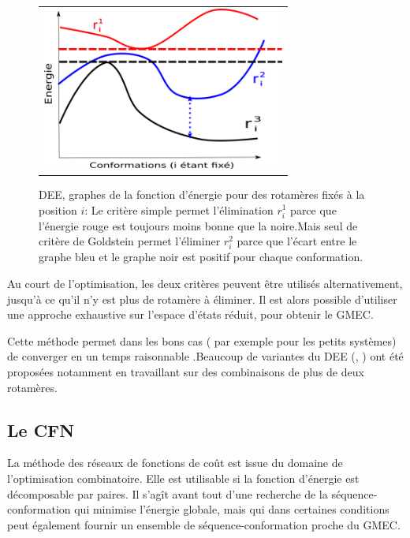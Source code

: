    \begin{figure}[!htbp]
     \centering
     \begin{tabular}{c}
       \includegraphics[width=8cm]{figure/DEE.png} &
     \end{tabular}
     
     \caption{DEE, graphes de la fonction d'énergie pour des rotamères fixés à la position $i$: Le critère simple permet l'élimination $r^1_i$ parce que l'énergie rouge est toujours moins bonne que la noire.Mais seul de critère de Goldstein permet l'éliminer $r^2_i$ parce que l'écart entre le graphe bleu et le graphe noir est positif pour chaque conformation.}
\label{fig:DDE}
   \end{figure}




Au court de l'optimisation, les deux critères peuvent être utilisés alternativement, jusqu'à ce qu'il n'y est plus de rotamère à éliminer. Il est alors possible d'utiliser une approche exhaustive sur l'espace d'états réduit, pour obtenir le GMEC.

Cette méthode permet dans les bons cas ( par exemple pour les petits systèmes) de converger en un temps raisonnable \cite{Leach98}.Beaucoup de variantes du DEE (\cite{Pierce00}, \cite{Lilien05}) ont été proposées notamment en travaillant sur des combinaisons de plus de deux rotamères.


\subsection{Le CFN}

La méthode des réseaux de fonctions de coût est issue du domaine de l'optimisation combinatoire. Elle est utilisable si la fonction d'énergie est décomposable par paires.
Il s'agît avant tout d'une recherche de la séquence-conformation qui minimise l'énergie globale, mais qui dans certaines conditions peut également fournir un ensemble de séquence-conformation proche du GMEC.

